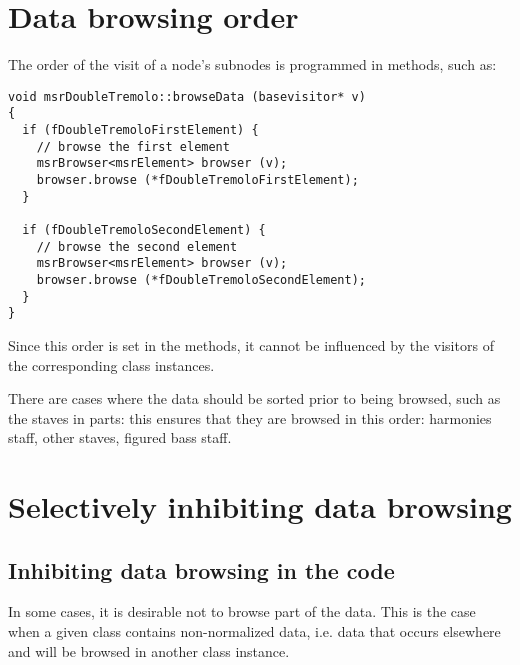 \section{Data browsing order}

The order of the visit of a node's subnodes is programmed in  methods, such as:
\begin{lstlisting}[language=CPlusPlus,caption={{\tt msrDoubleTremolo::browseData (basevisitor* v)}}]
void msrDoubleTremolo::browseData (basevisitor* v)
{
  if (fDoubleTremoloFirstElement) {
    // browse the first element
    msrBrowser<msrElement> browser (v);
    browser.browse (*fDoubleTremoloFirstElement);
  }

  if (fDoubleTremoloSecondElement) {
    // browse the second element
    msrBrowser<msrElement> browser (v);
    browser.browse (*fDoubleTremoloSecondElement);
  }
}
\end{lstlisting}

Since this order is set in the  methods, it cannot be influenced by the visitors of the corresponding class   instances.

There are cases where the data should be sorted prior to being browsed, such as the staves in parts: this ensures that they are browsed in this order: harmonies staff, other staves, figured bass staff.


\section{Selectively inhibiting data browsing}


\subsection{Inhibiting data browsing in the code}

In some cases, it is desirable not to browse part of the data. This is the case when a given class   contains non-normalized data, i.e. data that occurs elsewhere and will be browsed in another class   instance.

